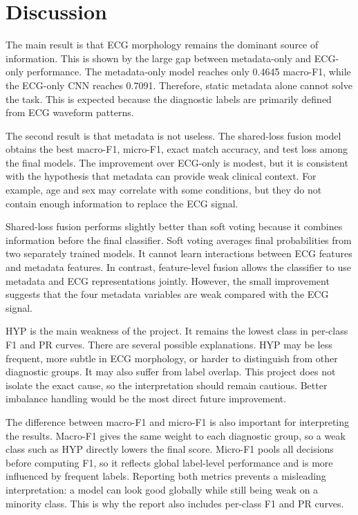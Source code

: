 \documentclass[11pt,a4paper]{article}
\begin{document}
\section{Discussion}

The main result is that ECG morphology remains the dominant source of information. This is shown by the large gap between metadata-only and ECG-only performance. The metadata-only model reaches only 0.4645 macro-F1, while the ECG-only CNN reaches 0.7091. Therefore, static metadata alone cannot solve the task. This is expected because the diagnostic labels are primarily defined from ECG waveform patterns.

The second result is that metadata is not useless. The shared-loss fusion model obtains the best macro-F1, micro-F1, exact match accuracy, and test loss among the final models. The improvement over ECG-only is modest, but it is consistent with the hypothesis that metadata can provide weak clinical context. For example, age and sex may correlate with some conditions, but they do not contain enough information to replace the ECG signal.

Shared-loss fusion performs slightly better than soft voting because it combines information before the final classifier. Soft voting averages final probabilities from two separately trained models. It cannot learn interactions between ECG features and metadata features. In contrast, feature-level fusion allows the classifier to use metadata and ECG representations jointly. However, the small improvement suggests that the four metadata variables are weak compared with the ECG signal.

HYP is the main weakness of the project. It remains the lowest class in per-class F1 and PR curves. There are several possible explanations. HYP may be less frequent, more subtle in ECG morphology, or harder to distinguish from other diagnostic groups. It may also suffer from label overlap. This project does not isolate the exact cause, so the interpretation should remain cautious. Better imbalance handling would be the most direct future improvement.

The difference between macro-F1 and micro-F1 is also important for interpreting the results. Macro-F1 gives the same weight to each diagnostic group, so a weak class such as HYP directly lowers the final score. Micro-F1 pools all decisions before computing F1, so it reflects global label-level performance and is more influenced by frequent labels. Reporting both metrics prevents a misleading interpretation: a model can look good globally while still being weak on a minority class. This is why the report also includes per-class F1 and PR curves.
\end{document}
